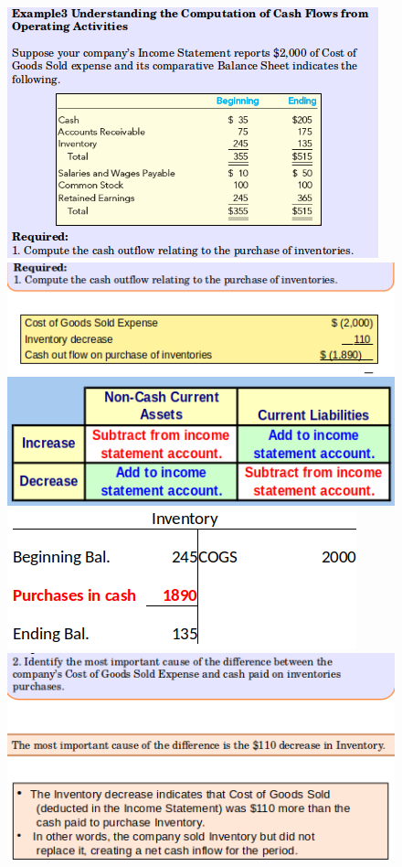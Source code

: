 \documentclass[../main.tex]{subfiles}
\begin{document}
	\begin{figure}[ht!]
		\centering
		\includegraphics[width=0.90\columnwidth]{images/c11/cash_flows_eg3_p1.png}
		\includegraphics[width=0.90\columnwidth]{images/c11/cash_flows_eg3_p2.png}
		\includegraphics[width=0.60\columnwidth]{images/c11/cash_flow_eg3_p3.png}
		\includegraphics[width=0.95\columnwidth]{images/c11/cash_flows_eg3_p4.png}

\end{figure}
\end{document}
